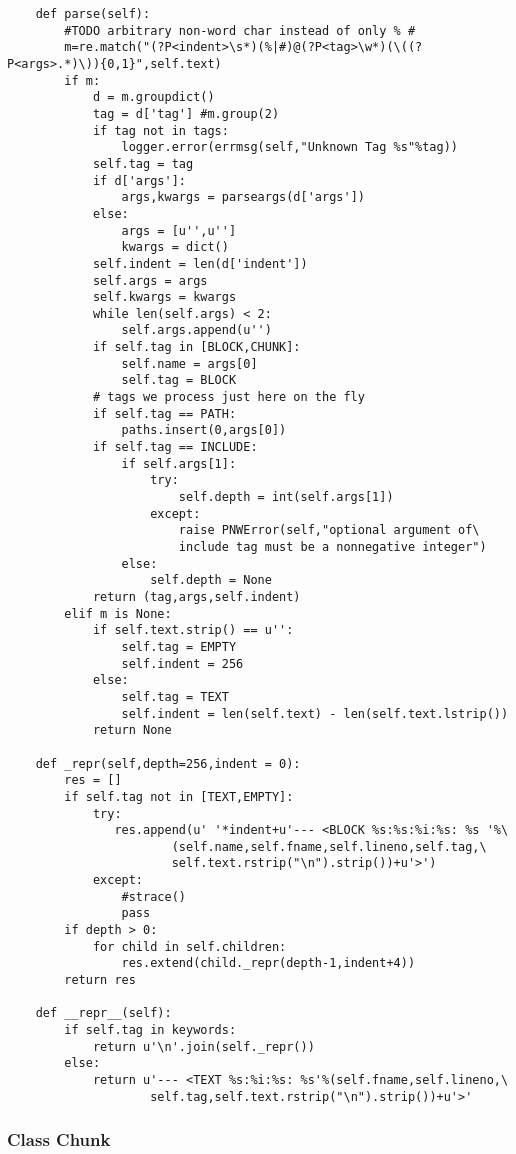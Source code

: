 \documentclass[neutral,proc,reqno]{ml-gen}
\begin{document}
\begin{lstlisting}
    def parse(self):
        #TODO arbitrary non-word char instead of only % #
        m=re.match("(?P<indent>\s*)(%|#)@(?P<tag>\w*)(\((?P<args>.*)\)){0,1}",self.text)
        if m:
            d = m.groupdict()
            tag = d['tag'] #m.group(2)
            if tag not in tags:
                logger.error(errmsg(self,"Unknown Tag %s"%tag))
            self.tag = tag
            if d['args']:
                args,kwargs = parseargs(d['args'])
            else: 
                args = [u'',u'']
                kwargs = dict()
            self.indent = len(d['indent'])
            self.args = args
            self.kwargs = kwargs
            while len(self.args) < 2:
                self.args.append(u'')
            if self.tag in [BLOCK,CHUNK]:
                self.name = args[0]
                self.tag = BLOCK
            # tags we process just here on the fly
            if self.tag == PATH:
                paths.insert(0,args[0])
            if self.tag == INCLUDE:
                if self.args[1]:
                    try:
                        self.depth = int(self.args[1])
                    except:
                        raise PNWError(self,"optional argument of\
                        include tag must be a nonnegative integer") 
                else:
                    self.depth = None
            return (tag,args,self.indent)
        elif m is None:
            if self.text.strip() == u'':
                self.tag = EMPTY
                self.indent = 256
            else:    
                self.tag = TEXT
                self.indent = len(self.text) - len(self.text.lstrip())
            return None

    def _repr(self,depth=256,indent = 0):
        res = []
        if self.tag not in [TEXT,EMPTY]:
            try:
               res.append(u' '*indent+u'--- <BLOCK %s:%s:%i:%s: %s '%\
                       (self.name,self.fname,self.lineno,self.tag,\
                       self.text.rstrip("\n").strip())+u'>')
            except:
                #strace()
                pass
        if depth > 0:
            for child in self.children:
                res.extend(child._repr(depth-1,indent+4))
        return res

    def __repr__(self):
        if self.tag in keywords:
            return u'\n'.join(self._repr())
        else:
            return u'--- <TEXT %s:%i:%s: %s'%(self.fname,self.lineno,\
                    self.tag,self.text.rstrip("\n").strip())+u'>'
\end{lstlisting}
\subsubsection{Class Chunk}
\end{document}
